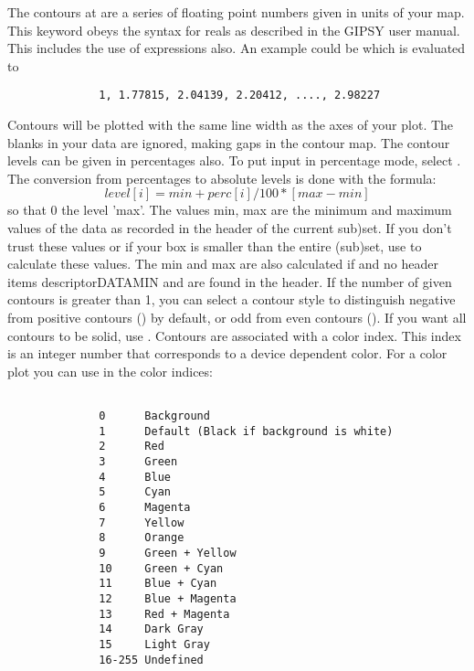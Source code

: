 The contours at  are a series of floating point
numbers given in units of your map. This keyword obeys the
syntax for reals as described in the GIPSY user manual.
This includes the use of expressions also. An example
could be 
which is evaluated to
\begin{verbatim}
              1, 1.77815, 2.04139, 2.20412, ...., 2.98227
\end{verbatim}
Contours will be plotted with the same line width as the
axes of your plot. The blanks in your data are ignored,
making gaps in the contour map. The contour levels can be
given in percentages also. To put input in percentage
mode, select . 
The conversion from percentages to
absolute levels is done with the formula:
$$level[i] = min + perc[i]/100 * [max-min]$$
so that 0%
the level 'max'.
The values min, max are the minimum and maximum values of
the data as recorded in the header of the current
sub)set. If you don't trust these values or if your box is
smaller than the entire (sub)set, use  to
calculate these values. The min and max are also
calculated if  and no header items 
descriptor{DATAMIN} and 
are found in the header.
If the number of given contours is greater than 1, you can 
select a contour style to distinguish negative from
positive contours () by default,  or odd from even 
contours (). If you want all contours to be solid, 
use . Contours are associated with a color index.
This index is an integer number that corresponds to a
device dependent color. For a color plot you can use in 
 the color indices:

\begin{verbatim}
                            
              0      Background
              1      Default (Black if background is white)
              2      Red
              3      Green
              4      Blue
              5      Cyan
              6      Magenta
              7      Yellow
              8      Orange
              9      Green + Yellow
              10     Green + Cyan
              11     Blue + Cyan
              12     Blue + Magenta
              13     Red + Magenta
              14     Dark Gray
              15     Light Gray
              16-255 Undefined
\end{verbatim}

